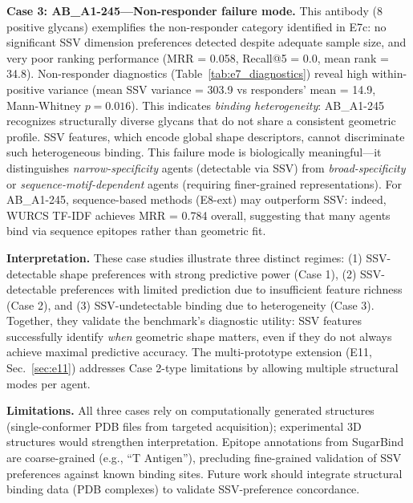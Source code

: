 \textbf{Case 3: AB\_A1-245---Non-responder failure mode.} This antibody (8 positive glycans) exemplifies the non-responder category identified in E7c: no significant SSV dimension preferences detected despite adequate sample size, and very poor ranking performance (MRR = 0.058, Recall@5 = 0.0, mean rank = 34.8). Non-responder diagnostics (Table~\ref{tab:e7_diagnostics}) reveal high within-positive variance (mean SSV variance = 303.9 vs responders' mean = 14.9, Mann-Whitney $p = 0.016$). This indicates \emph{binding heterogeneity}: AB\_A1-245 recognizes structurally diverse glycans that do not share a consistent geometric profile. SSV features, which encode global shape descriptors, cannot discriminate such heterogeneous binding. This failure mode is biologically meaningful---it distinguishes \emph{narrow-specificity} agents (detectable via SSV) from \emph{broad-specificity} or \emph{sequence-motif-dependent} agents (requiring finer-grained representations). For AB\_A1-245, sequence-based methods (E8-ext) may outperform SSV: indeed, WURCS TF-IDF achieves MRR = 0.784 overall, suggesting that many agents bind via sequence epitopes rather than geometric fit.

\textbf{Interpretation.} These case studies illustrate three distinct regimes: (1) SSV-detectable shape preferences with strong predictive power (Case 1), (2) SSV-detectable preferences with limited prediction due to insufficient feature richness (Case 2), and (3) SSV-undetectable binding due to heterogeneity (Case 3). Together, they validate the benchmark's diagnostic utility: SSV features successfully identify \emph{when} geometric shape matters, even if they do not always achieve maximal predictive accuracy. The multi-prototype extension (E11, Sec.~\ref{sec:e11}) addresses Case 2-type limitations by allowing multiple structural modes per agent.

\textbf{Limitations.} All three cases rely on computationally generated structures (single-conformer PDB files from targeted acquisition); experimental 3D structures would strengthen interpretation. Epitope annotations from SugarBind are coarse-grained (e.g., ``T Antigen''), precluding fine-grained validation of SSV preferences against known binding sites. Future work should integrate structural binding data (PDB complexes) to validate SSV-preference concordance.
